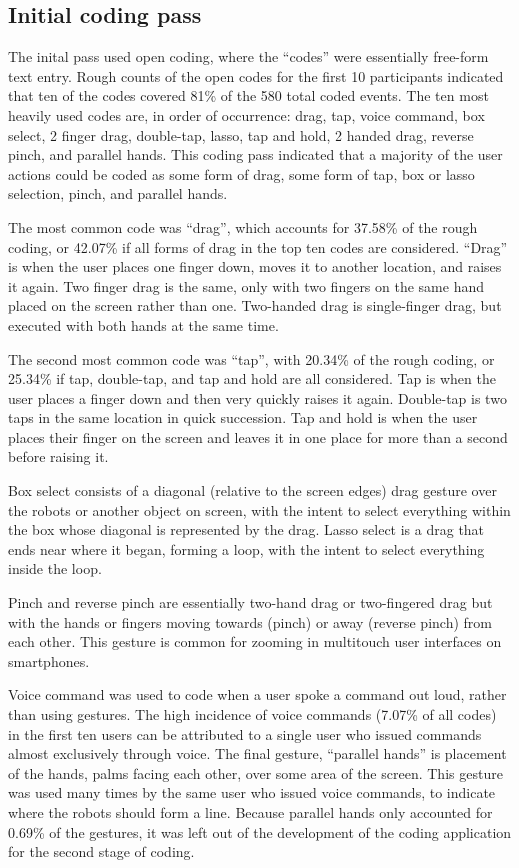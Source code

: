 \subsection{Initial coding pass} \label{section:Initial_coding_pass}

The inital pass used open coding, where the ``codes'' were essentially free-form text entry. 
Rough counts of the open codes for the first 10 participants indicated that ten of the codes covered 81\% of the 580 total coded events. 
The ten most heavily used codes are, in order of occurrence: drag, tap, voice command, box select, 2 finger drag, double-tap, lasso, tap and hold, 2 handed drag, reverse pinch, and parallel hands. 
This coding pass indicated that a majority of the user actions could be coded as some form of drag, some form of tap, box or lasso selection, pinch, and parallel hands. 

The most common code was ``drag'', which accounts for 37.58\% of the rough coding, or 42.07\% if all forms of drag in the top ten codes are considered. ``Drag'' is when the user places one finger down, moves it to another location, and raises it again. Two finger drag is the same, only with two fingers on the same hand placed on the screen rather than one. Two-handed drag is single-finger drag, but executed with both hands at the same time. 

The second most common code was ``tap'', with 20.34\% of the rough coding, or 25.34\% if tap, double-tap, and tap and hold are all considered. Tap is when the user places a finger down and then very quickly raises it again. Double-tap is two taps in the same location in quick succession. Tap and hold is when the user places their finger on the screen and leaves it in one place for more than a second before raising it. 

Box select consists of a diagonal (relative to the screen edges) drag gesture over the robots or another object on screen, with the intent to select everything within the box whose diagonal is represented by the drag. 
Lasso select is a drag that ends near where it began, forming a loop, with the intent to select everything inside the loop. 

Pinch and reverse pinch are essentially two-hand drag or two-fingered drag but with the hands or fingers moving towards (pinch) or away (reverse pinch) from each other.
This gesture is common for zooming in multitouch user interfaces on smartphones. 

Voice command was used to code when a user spoke a command out loud, rather than using gestures. The high incidence of voice commands (7.07\% of all codes) in the first ten users can be attributed to a single user who issued commands almost exclusively through voice. 
The final gesture, ``parallel hands'' is placement of the hands, palms facing each other, over some area of the screen. This gesture was used many times by the same user who issued voice commands, to indicate where the robots should form a line. Because parallel hands only accounted for 0.69\% of the gestures, it was left out of the development of the coding application for the second stage of coding. 

